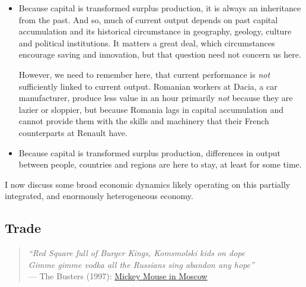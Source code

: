\documentclass[11pt,a4paper,oneside,openright]{article}
\begin{document}
\begin{itemize}
	\item Because capital is transformed surplus production, it is always an inheritance from the past. 
	And so, much of current output depends on past capital accumulation and its historical circumstance in geography, geology, culture and political institutions. 
	It matters a great deal, which circumstances encourage saving and innovation, but that question need not concern us here. %

	However, we need to remember here, that current performance is \emph{not} sufficiently linked to current output. 
	Romanian workers at Dacia, a car manufacturer, produce less value in an hour primarily \emph{not} because they are lazier or sloppier, but because Romania lags in capital accumulation and cannot provide them with the skills and machinery that their French counterparts at Renault have. 

	\item Because capital is transformed surplus production, differences in output between people, countries and regions are here to stay, at least for some time.
\end{itemize}


I now discuss some broad economic dynamics likely operating on this partially integrated, and enormously heterogeneous economy. 



\subsection[Trade]{Trade}

\begin{verse}
	\emph{``Red Square full of Burger Kings, Komsmolski kids on dope \\ 
	Gimme gimme vodka all the Russians sing abandon any hope''\\}
	--- The Busters (1997): \href{http://www.youtube.com/watch?v=xsxRMOnpMTY}{Mickey Mouse in Moscow}\\
\end{verse}
\end{document}
